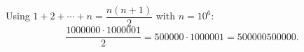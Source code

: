 Using $1+2+\cdots+n=\dfrac{n(n+1)}{2}$ with $n=10^6$:
\[
\dfrac{1000000\cdot1000001}{2}=500000\cdot1000001=\boxed{500000500000}.
\]
